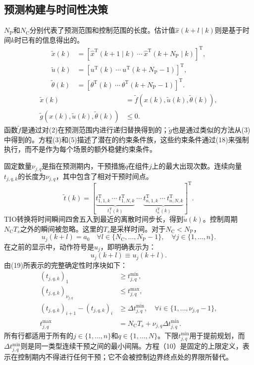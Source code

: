 \documentclass{article}
\begin{document}
\subsection*{预测构建与时间性决策}
$N_{\mathrm P}$和$N_{\mathrm C}$分别代表了预测范围和控制范围的长度。估计值$\hat x(k+l\mid k)$则是基于时间$k$时已有的信息得出的。
\[
\begin{aligned}
\tilde x(k)&=[\hat x^{\mathrm T}(k+1\mid k)\ \cdots\ \hat x^{\mathrm T}(k+N_{\mathrm P}\mid k)]^{\mathrm T},\\
\tilde u(k)&=[u^{\mathrm T}(k)\ \cdots\ u^{\mathrm T}(k+N_{\mathrm P}-1)]^{\mathrm T},\\
\tilde\theta(k)&=[\theta^{\mathrm T}(k)\ \cdots\ \theta^{\mathrm T}(k+N_{\mathrm P}-1)]^{\mathrm T}.
\end{aligned}
\]
\begin{align}
\tilde x(k)&=\tilde f(x(k),\tilde u(k),\tilde\theta(k)), \tag{4}\\
\tilde g(x(k),\tilde u(k),\tilde\theta(k))&\leq0. \tag{5}
\end{align}
函数$\tilde f$是通过对(2)在预测范围内进行递归替换得到的；$\tilde g$也是通过类似的方法从(3)中得到的。方程(3)和(5)描述了潜在的约束条件族，这些约束条件通过(18)来强制执行，而不是作为每个场景的额外稳健约束条件。

固定数量$\nu_{j,q}$是指在预测期内，干预措施$q$在组件$j$上的最大出现次数。连续向量$t_{j,q,k}$的长度为$\nu_{j,q}$，其中包含了相对干预时间点。
\begin{equation}
\tilde t(k)=\left[
\underbrace{t_{1,1,k}^{\mathrm T}\ \cdots\ t_{1,N,k}^{\mathrm T}}_{t_1^{\mathrm T}(k)}\ \cdots\
\underbrace{t_{n,1,k}^{\mathrm T}\ \cdots\ t_{n,N,k}^{\mathrm T}}_{t_n^{\mathrm T}(k)}
\right]^{\mathrm T}.\tag{6}
\end{equation}
TIO转换将时间瞬间四舍五入到最近的离散时间步长，得到$\tilde u(k)$。控制周期$N_{\mathrm C}T_s$之外的瞬间被忽略。这里的$T_s$是采样时间。对于$N_{\mathrm C}<N_{\mathrm P}$，
\[
u_j(k+l)=a_0\quad
\forall l\in\{N_{\mathrm C},\ldots,N_{\mathrm P}-1\},\quad
\forall j\in\{1,\ldots,n\}.
\]
在之前的显示中，动作符号是$u_j$，即明确表示为：
\[
u_j(k+l)\equiv u_j(k+l).
\]
由(19)所表示的完整确定性时序块如下：
\begin{align}
(t_{j,q,k})_1&\geq t_{j,q}^{\min}, \tag{7}\\
(t_{j,q,k})_{\nu_{j,q}}&\leq t_{j,q}^{\max}, \tag{8}\\
(t_{j,q,k})_{i+1}-(t_{j,q,k})_i&\geq\Delta t_{j,q}^{\min},
\quad\forall i\in\{1,\ldots,\nu_{j,q}-1\}, \tag{9}\\
t_{j,q}^{\max}&=N_{\mathrm C}T_s+\nu_{j,q}\Delta t_{j,q}^{\min}. \tag{10}
\end{align}
所有行都适用于所有的$j\in\{1,\ldots,n\}$和$q\in\{1,\ldots,N\}$。下限$t_{j,q}^{\min}$用于提前规划，而$\Delta t_{j,q}^{\min}$则是同一类型连续干预之间的最小间隔。方程（10）是固定的上限定义，表示在控制期内不得进行任何干预；它不会被控制边界终点处的界限所替代。
\end{document}
